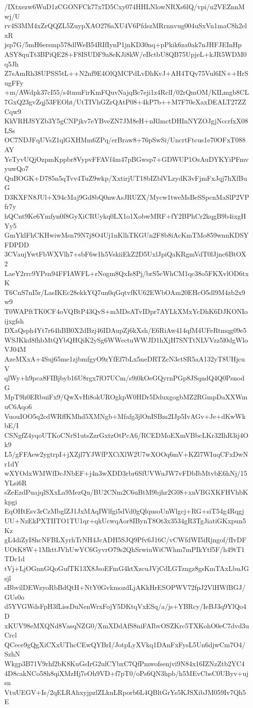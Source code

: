 /IXtxezw6WuD1zCGONFCk77x7D5Cxy074HHLNlowNRXs6lQ/vpi/u2VEZnnMwj/U
rv4S3MM4xZrQQZL5ZuypXAO276aXU4V6PfdszMRrnnvug004uSxVn1maC8h2elxR
jsp7G/5mH6ersmp578dlWeB54RIfIynP1jnKD30nq+pPkik6za0ak7nJHFJEInHp
ASY8quTt3BPiQE28+F8ISUDF9a8eKJi8kW/eBctbU8QB75UpjeL+kJR5WDM0q5Jh
Z7sAmRh38UPSS5tL++N2nf9E4OlQMCPdLvDhKvJ+AH4TQv75Vul6IN++HrSugFFy
+m/AWdpk37cI55/s4tmuFirKmFQuvNajqBc7eji1z4RclI/02rQmOM/KILmgb8CL
7GxQ23gvZqj53FEOht/UtTIVhGZrQAtP08+4kP7b++M7F70eXaxDEALT27ZZCqw9
KkVRHJSYZb3Y5gCNPjkv7eYBveZN7JM8eH+nRlmctDHInNYZOJgjNccrfxX08LSs
OC7NDJFqUVsZ1qlGXHMm6ZPq/erBraw8+76pSwSi/UncrtFtcus1e70OFxT088AY
YeTyvUQjOzpmKppbr8VypvFFAVf4m47pBGwsp7+GDWUP1OsAuDYKYiPFmvyuwQo7
QuBOGK+D785n5qTvv4TuZ9wkp/XxtirjUT18bIZblVLzydK3vFjmFxJqj7hXfBuG
D3KXFN8JUl+X94cMaj9Gd8bQ0nwAsJRUZX/Mycw1tweMsBeSSpcnMaSlP2VPfr7y
hQCnt9Ke6Ymfyn0f8GyXiCRUykq0LX1o1XobwMRF+fY2BPhCr2kqgB9b4ixgHYy5
GmYklFhCKHwiwMsn79N7j8O4Uj1nKlhTKGUn2F8b8iAcKmTMo859wnnKDSYFDPDD
3CVaujYwtFbWXVlh7+sbF6w1h5VskiiEkZ2D5UxlJpiQaKRgmVdT0lJjnc6BtOX2
LaeY2rrc9YPsn94FFIAWFL+rNogm8QxIs8Pj/brS5cWhCM1qc38o5FKXvlOD6txK
T6CnS7nI5r/LasIKEc28ekkYQ7un0qGqtvfKU62EWbOAm20EHcO5dl9M4zb2x9w9
T0WAPftTK0CF4oVQBtP43QvS+mMDsATvIDpr7AYLkXMxYcDhK6DJKONIoijxgfsh
DXaQsph4Yt7r64hBB0X2dBzj46IDAupZj6kXsh/E6RiAw414qfM4UFeRtmqg09e5
WSJKkd8fhbMtQYbQHQiK2ySg6WWectuWWJD1hXjH7SNTtNLVVzz5l0dgWloVJ04M
AzeMXxA+4Suj65me1zjbmfgyO9zYfEf7bLx5neDRTZcN3ctSR5aA132yT8UHjcuV
qlWy+h9pca8FIBjbyb16U8rgx7fO7UCm/s9i0kOeGQyrnPGp8JSqndQ4Q0PsnodG
MpT9h0ERbuiFx9/QwXvHi8okUROgkpW0HDr5DduxgogbMZ2RGmpDaXXWmuC6Aqo6
VuouIOO5q2cdWRffKMhd5XMNgb+Mfafg3jlOnISBm2IJp5IvAGv+Je+dKwWkbE/I
CSNgfZ4yqoUTKoCNrS1utsZzrGxtzOtPcA6/RCEDMoEXmVBbcLKr32IhR3ij4Ok9
L5/gFFAew2ygtrpI+jXZjl7YJWfPXCiXlW2U7wXOOq6mV+KZl7WIuqCFxDwNr1dY
wXYOdxWMWfDcJNbEF+j4n3wXDD3rbr6SfUVWuJW7vFDbIbMtvbE6hNj/15YLsi6R
sZeEzdPuajqlSXxLa9MezQu/BU2CNm2C6uBtM9bjhr2G08+xnVBGXKFHVhbKkpgi
EqOHtEsv3rCzMbglZJ1JxMAqIWlfgi5dVd0gQlqusoUnWlgcj+RG+siT54g4Rqgj
UU+NzEkPXTIITO1TU1qr+qkUcwqAor8IBynT8Ot3x3534gR3TgJiatiGKxpun5Kz
gL4diZyI8hcNFBLXyrhTrNH4JcADH5SJQ9Pfv6J16C/vCWfdWI5iRjngof/fIvDF
UOtK8W+1MkttJVhUwYC6GyvrO79s2QhSrwiuWiCWhm7mPIkYtf5F/h49tT1TDc1d
tVj+LjOGnnGQoGufTK13X8JsoEFmG4ktXzcuJVjCdLGTzngz8gsKmTAxLbuJGsjl
sBbvilDEWzyoRbBdQtH+NtY0GvkmozdLjAKkHrESOPWV72fpJ2VlHWfBGJ/GUs0o
d5YVGWdsFpH3fLissDuNenWrxFojY5DKtqVxESq/a/js+YBRcy/IeBJ3q9YlQo4D
xKUV98eMXQNd8VasqNZG0/XmXDdAfS8niFAIbvOSZKrc5TXKohO0eC7dvd3uCrcl
QCece9gQgXiCXxUThcCEwQYBrI/JotpLyXVkq1DAnFxFysL5Un6djwCm7O4/SzhN
Wkgp3B71V9rhf2bK8KuGsIrG2ulCYbxC7QfPmwofsenjvi9N84x16IZNzZtb2YC4
4D8cakNCo58h8qiXMzHj7eOh9VD+f7pT0/oPs6QN3hpb/h5MEvCbsC0UByv+ujsn
VtuUEGV+Is/2qELRAhxyjpzlZLknLRporb6L4QBltGrYs5KJSXibJM059Iv7Qh5E
